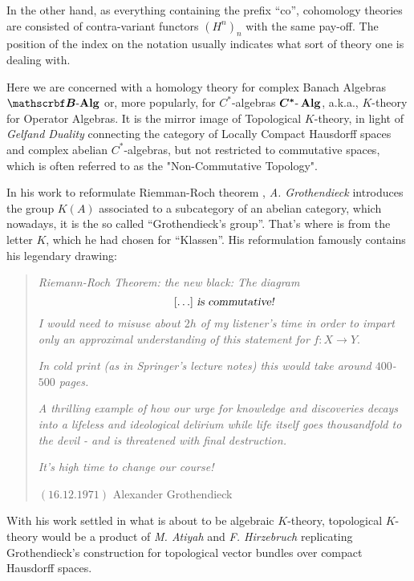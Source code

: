 In the other hand, as everything containing the prefix ``co'', cohomology theories are consisted of contra-variant functors $(H^n)_{n}$ with the same pay-off. The position of the index on the notation usually indicates what sort of theory one is dealing with. 

Here we are concerned with a homology theory for complex Banach Algebras $\BAlg$ or, more popularly, for $C^*$-algebras $\boldsymbol{C^*\text{-}\operatorname{Alg}}$, a.k.a., $K$-theory for Operator Algebras. It is the mirror image of Topological $K$-theory, in light of \textit{Gelfand Duality} connecting the category of Locally Compact Hausdorff spaces and complex abelian $C^*$-algebras, but not restricted to commutative spaces, 
which is often referred to as the "Non-Commutative Topology". 

In his work to reformulate Riemman-Roch theorem \cite{borel1958theoreme}, \textit{A. Grothendieck} introduces the group $K(A)$ associated to a subcategory of an abelian category, which nowadays, it is the so called ``Grothendieck's group''. That's where is from the letter $K$, which he had chosen for ``Klassen''. His reformulation famously contains his legendary drawing:
\begin{figure}[H]
	\centering
	
\end{figure}
\begin{quote}
	\textsl{Riemann-Roch Theorem: the new black: The diagram}
	$$[\ldots] \textsl{ is commutative!}$$
	\textsl{I would need to misuse about $2 h$ of my listener's time in order to impart only an approximal understanding of this statement for }$f:X \longrightarrow Y$.
	
	\textsl{In cold print (as in Springer's lecture notes) this would take around $400$-$500$ pages.}
	
	\textsl{A thrilling example of how our urge for knowledge and discoveries decays into a lifeless and ideological delirium while life itself goes thousandfold to the devil - and is threatened with final destruction.}
	
	\textsl{It's high time to change our course!}

	$(16.12 .1971)$ \hfill Alexander Grothendieck
\end{quote}
With his work settled in what is about to be algebraic $K$-theory, topological $K$-theory would be a product of \textit{M. Atiyah} and \textit{F. Hirzebruch} replicating Grothendieck's construction for topological vector bundles over compact Hausdorff spaces. 

